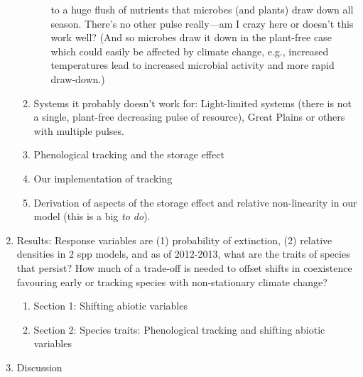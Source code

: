 \documentclass[11pt,a4paper,oneside]{article}
\begin{document}
\begin{enumerate}
\begin{enumerate}
\begin{enumerate}
  to a huge flush of nutrients \citep{Zak:1990ar} that microbes (and plants) draw down
  all season. There's no other pulse really---am I crazy here or
  doesn't this work well? (And so microbes draw it down in the
  plant-free case which could easily be affected by climate change,
  e.g., increased temperatures lead to increased microbial activity
  and more rapid draw-down.)
\end{enumerate}
\item Systems it probably doesn't work for: Light-limited systems
  (there is not a single, plant-free decreasing pulse of resource),
  Great Plains or others with multiple pulses.
\item Phenological tracking and the storage effect
\item Our implementation of tracking
\item Derivation of aspects of the storage effect and relative
  non-linearity in our model (this is a big \emph{to do}).
\end{enumerate}
\item Results: Response variables are (1) probability of extinction,
  (2) relative
  densities in 2 spp models, and as of 2012-2013, what are the traits of species that persist? How much of a trade-off is needed to offset shifts in coexistence favouring early or tracking species with non-stationary climate change?\\
\begin{enumerate}
\item Section 1: Shifting abiotic variables
\item Section 2: Species traits: Phenological tracking and shifting
  abiotic variables
\end{enumerate}
\item Discussion
\end{enumerate}
\end{document}
